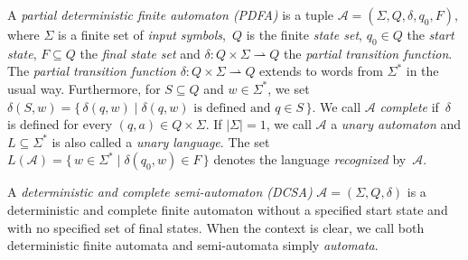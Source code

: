 A \emph{partial deterministic finite automaton (PDFA)} is a tuple $\mathcal A = (\Sigma, Q, \delta, q_0, F)$,
where $\Sigma$ is a finite set of \emph{input symbols},~$Q$ is the finite \emph{state set}, $q_0 \in Q$ the \emph{start state}, $F \subseteq Q$ the \emph{final state set} and $\delta \colon Q\times \Sigma \rightharpoonup Q$ the \emph{partial transition function}.
The \emph{partial transition function} $\delta \colon Q\times \Sigma \rightharpoonup Q$ extends to words from $\Sigma^*$ in the usual way. 
Furthermore, for $S \subseteq Q$ and $w \in \Sigma^*$, we set $\delta(S, w) = \{\,\delta(q, w) \mid \mbox{$\delta(q,w)$ is defined and } q \in S\,\}$.
We call $\mathcal A$ \emph{complete} if~$\delta$ is defined for every $(q,a)\in Q \times \Sigma$.
If $|\Sigma| = 1$, we call $\mathcal A$ a \emph{unary automaton} and
 $L \subseteq \Sigma^*$ is also called a \emph{unary language}.
The set $L(\mathcal A) = \{\, w \in \Sigma^* \mid \delta(q_0, w) \in F\,\}$ denotes the language
\emph{recognized} %
by~$\mathcal A$.


A \emph{deterministic and complete semi-automaton (DCSA)} $\mathcal A = (\Sigma, Q, \delta)$
is a deterministic and complete finite automaton without a specified start state
and with no specified set of final states.
When the context is clear, we call both deterministic finite automata and semi-automata simply \emph{automata}.


